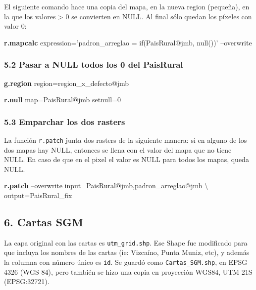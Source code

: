 \documentclass[spanish,]{article}
\newenvironment{Shaded}{}{}
\newcommand{\KeywordTok}[1]{\textcolor[rgb]{0.00,0.44,0.13}{\textbf{{#1}}}}
\newcommand{\StringTok}[1]{\textcolor[rgb]{0.25,0.44,0.63}{{#1}}}
\newcommand{\NormalTok}[1]{{#1}}
\begin{document}
El siguiente comando hace una copia del mapa, en la nueva region
(pequeña), en la que los valores \textgreater{} 0 se convierten en NULL.
Al final sólo quedan los píxeles con valor 0:

\begin{Shaded}
\begin{Highlighting}[]
\KeywordTok{r.mapcalc} \NormalTok{expression=}\StringTok{'padron_arreglao = if(PaisRural@jmb, null())'} \NormalTok{--overwrite}
\end{Highlighting}
\end{Shaded}

\subsubsection{5.2 Pasar a NULL todos los 0 del
PaisRural}\label{pasar-a-null-todos-los-0-del-paisrural}

\begin{Shaded}
\begin{Highlighting}[]
\KeywordTok{g.region} \NormalTok{region=region_x_defecto@jmb}

\KeywordTok{r.null} \NormalTok{map=PaisRural@jmb setnull=0}
\end{Highlighting}
\end{Shaded}

\subsubsection{5.3 Emparchar los dos
rasters}\label{emparchar-los-dos-rasters}

La función \texttt{r.patch} junta dos rasters de la siguiente manera: si
en alguno de los dos mapas hay NULL, entonces se llena con el valor del
mapa que no tiene NULL. En caso de que en el pixel el valor es NULL para
todos los mapas, queda NULL.

\begin{Shaded}
\begin{Highlighting}[]
\KeywordTok{r.patch} \NormalTok{--overwrite input=PaisRural@jmb,padron_arreglao@jmb \textbackslash{}}
  \NormalTok{output=PaisRural_fix}
\end{Highlighting}
\end{Shaded}

\subsection{6. Cartas SGM}\label{cartas-sgm}

La capa original con las cartas es \texttt{utm\_grid.shp}. Ese Shape fue
modificado para que incluya los nombres de las cartas (ie: Vizcaíno,
Punta Muniz, etc), y además la columna con número único es \texttt{id}.
Se guardó como \texttt{Cartas\_SGM.shp}, en EPSG 4326 (WGS 84), pero
también se hizo una copia en proyección WGS84, UTM 21S (EPSG:32721).
\end{document}
